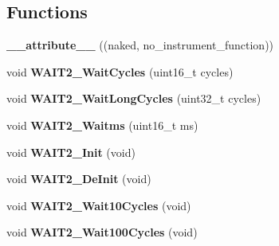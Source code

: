 \subsection*{Functions}
\begin{DoxyCompactItemize}
\item 
\hypertarget{group___w_a_i_t2__module_ga0d401ca6ca297b5b7a450deed0c42b78}{{\bfseries \-\_\-\-\_\-attribute\-\_\-\-\_\-} ((naked, no\-\_\-instrument\-\_\-function))}\label{group___w_a_i_t2__module_ga0d401ca6ca297b5b7a450deed0c42b78}

\item 
\hypertarget{group___w_a_i_t2__module_ga0b3ae724f3fe49461aeb652417583368}{void {\bfseries W\-A\-I\-T2\-\_\-\-Wait\-Cycles} (uint16\-\_\-t cycles)}\label{group___w_a_i_t2__module_ga0b3ae724f3fe49461aeb652417583368}

\item 
\hypertarget{group___w_a_i_t2__module_ga5519763aaeaee6e8b167520411235c92}{void {\bfseries W\-A\-I\-T2\-\_\-\-Wait\-Long\-Cycles} (uint32\-\_\-t cycles)}\label{group___w_a_i_t2__module_ga5519763aaeaee6e8b167520411235c92}

\item 
\hypertarget{group___w_a_i_t2__module_ga0ca6d6b6223491aaa5fca0ef97ecee27}{void {\bfseries W\-A\-I\-T2\-\_\-\-Waitms} (uint16\-\_\-t ms)}\label{group___w_a_i_t2__module_ga0ca6d6b6223491aaa5fca0ef97ecee27}

\item 
\hypertarget{group___w_a_i_t2__module_ga02e3940dac9ccd5ffc55a0ea68162a6b}{void {\bfseries W\-A\-I\-T2\-\_\-\-Init} (void)}\label{group___w_a_i_t2__module_ga02e3940dac9ccd5ffc55a0ea68162a6b}

\item 
\hypertarget{group___w_a_i_t2__module_ga1f7e715f7e7119d3b036a08c1635a3c3}{void {\bfseries W\-A\-I\-T2\-\_\-\-De\-Init} (void)}\label{group___w_a_i_t2__module_ga1f7e715f7e7119d3b036a08c1635a3c3}

\item 
\hypertarget{group___w_a_i_t2__module_ga6b9655eaa0aea0b7d727bf57dae98c52}{void {\bfseries W\-A\-I\-T2\-\_\-\-Wait10\-Cycles} (void)}\label{group___w_a_i_t2__module_ga6b9655eaa0aea0b7d727bf57dae98c52}

\item 
\hypertarget{group___w_a_i_t2__module_ga545ebe42a76d7f779ab3d58533827638}{void {\bfseries W\-A\-I\-T2\-\_\-\-Wait100\-Cycles} (void)}\label{group___w_a_i_t2__module_ga545ebe42a76d7f779ab3d58533827638}

\end{DoxyCompactItemize}


